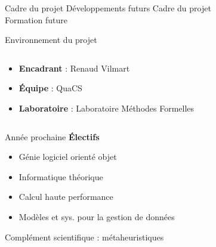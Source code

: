 \documentclass[french, 12pt]{beamer}
\begin{document}
\begin{frame}{Cadre du projet Développements futurs}
    \huge{Cadre du projet \\ Formation future}
\end{frame}

\begin{frame}{Environnement du projet}
    \begin{columns}
        \begin{column}{0.6\textwidth}
            \begin{itemize}
                \item \textbf{Encadrant} : Renaud Vilmart
                \item \textbf{Équipe} : QuaCS
                \item \textbf{Laboratoire} : Laboratoire Méthodes Formelles
            \end{itemize}
        \end{column}
        \begin{column}{0.4\textwidth}
            \begin{center}
                
                \vspace{0.5cm}
                
            \end{center}
        \end{column}
    \end{columns}
\end{frame}

\begin{frame}{Année prochaine}
\textbf{Électifs} %
\begin{itemize}
    \item \small{Génie logiciel orienté objet}
    \item \small{Informatique théorique}
    \item \small{Calcul haute performance}
    \item \small{Modèles et sys. pour la gestion de données}
\end{itemize}
\vspace{1em}
Complément scientifique : métaheuristiques
\end{frame}
\end{document}
